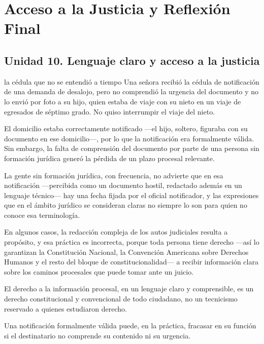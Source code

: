 \documentclass[12pt,oneside]{book}
\begin{document}
\chapter{Acceso a la Justicia y Reflexión Final}

\section{Unidad 10. Lenguaje claro y acceso a la justicia}

\begin{example}{la cédula que no se entendió a tiempo}
Una señora recibió la cédula de notificación de una demanda de desalojo, pero no comprendió la urgencia del documento y no lo envió por foto a su hijo, quien estaba de viaje con su nieto en un viaje de egresados de séptimo grado. No quiso interrumpir el viaje del nieto.

El domicilio estaba correctamente notificado ---el hijo, soltero, figuraba con su documento en ese domicilio---, por lo que la notificación era formalmente válida. Sin embargo, la falta de comprensión del documento por parte de una persona sin formación jurídica generó la pérdida de un plazo procesal relevante.
\end{example}

La gente sin formación jurídica, con frecuencia, no advierte que en esa notificación ---percibida como un documento hostil, redactado además en un lenguaje técnico--- hay una fecha fijada por el oficial notificador, y las expresiones que en el ámbito jurídico se consideran claras no siempre lo son para quien no conoce esa terminología.

En algunos casos, la redacción compleja de los autos judiciales resulta a propósito, y esa práctica es incorrecta, porque toda persona tiene derecho ---así lo garantizan la Constitución Nacional, la Convención Americana sobre Derechos Humanos y el resto del bloque de constitucionalidad--- a recibir información clara sobre los caminos procesales que puede tomar ante un juicio.

\begin{important}
El derecho a la información procesal, en un lenguaje claro y comprensible, es un derecho constitucional y convencional de todo ciudadano, no un tecnicismo reservado a quienes estudiaron derecho.

Una notificación formalmente válida puede, en la práctica, fracasar en su función si el destinatario no comprende su contenido ni su urgencia.
\end{important}
\end{document}
